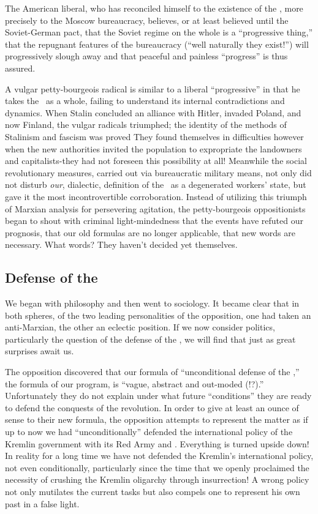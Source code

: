 The American liberal, who has reconciled himself to the existence of the \USSR, more precisely to the Moscow bureaucracy, believes, or at least believed until the Soviet-German pact, that the Soviet regime on the whole is a “progressive thing,” that the repugnant features of the bureaucracy (“well naturally they exist!”) will progressively slough away and that peaceful and painless “progress” is thus assured.

A vulgar petty-bourgeois radical is similar to a liberal “progressive” in that he takes the \USSR\ as a whole, failing to understand its internal contradictions and dynamics. When Stalin concluded an alliance with Hitler, invaded Poland, and now Finland, the vulgar radicals triumphed; the identity of the methods of Stalinism and fascism was proved They found themselves in difficulties however when the new authorities invited the population to expropriate the landowners and capitalists-they had not foreseen this possibility at all! Meanwhile the social revolutionary measures, carried out via bureaucratic military means, not only did not disturb \emph{our}, dialectic, definition of the \USSR\ as a degenerated workers’ state, but gave it the most incontrovertible corroboration. Instead of utilizing this triumph of Marxian analysis for persevering agitation, the petty-bourgeois oppositionists began to shout with criminal light-mindedness that the events have refuted our prognosis, that our old formulas are no longer applicable, that new words are necessary. What words? They haven’t decided yet themselves.

\subsection*{Defense of the \USSR}

We began with philosophy and then went to sociology. It became clear that in both spheres, of the two leading personalities of the opposition, one had taken an anti-Marxian, the other an eclectic position. If we now consider politics, particularly the question of the defense of the \USSR, we will find that just as great surprises await us.

The opposition discovered that our formula of “unconditional defense of the \USSR,” the formula of our program, is “vague, abstract and out-moded (!?).” Unfortunately they do not explain under what future “conditions” they are ready to defend the conquests of the revolution. In order to give at least an ounce of sense to their new formula, the opposition attempts to represent the matter as if up to now we had “unconditionally” defended the international policy of the Kremlin government with its Red Army and \GPU. Everything is turned upside down! In reality for a long time we have not defended the Kremlin’s international policy, not even conditionally, particularly since the time that we openly proclaimed the necessity of crushing the Kremlin oligarchy through insurrection! A wrong policy not only mutilates the current tasks but also compels one to represent his own past in a false light.

